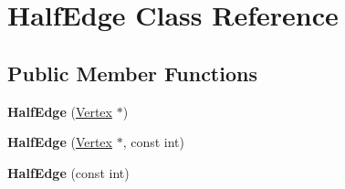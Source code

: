 \hypertarget{class_half_edge}{\section{Half\-Edge Class Reference}
\label{class_half_edge}
}
\subsection*{Public Member Functions}
\begin{DoxyCompactItemize}
\item 
\hypertarget{class_half_edge_af73e9a2bacfdc231be1fa45f8d1dc485}{{\bfseries Half\-Edge} (\hyperlink{class_vertex}{Vertex} $\ast$)}\label{class_half_edge_af73e9a2bacfdc231be1fa45f8d1dc485}

\item 
\hypertarget{class_half_edge_a2fb58eba5dda37fd6500686fcd514b17}{{\bfseries Half\-Edge} (\hyperlink{class_vertex}{Vertex} $\ast$, const int)}\label{class_half_edge_a2fb58eba5dda37fd6500686fcd514b17}

\item 
\hypertarget{class_half_edge_a1430b33dfe994bcc932df21ab5824fae}{{\bfseries Half\-Edge} (const int)}\label{class_half_edge_a1430b33dfe994bcc932df21ab5824fae}

\end{DoxyCompactItemize}
